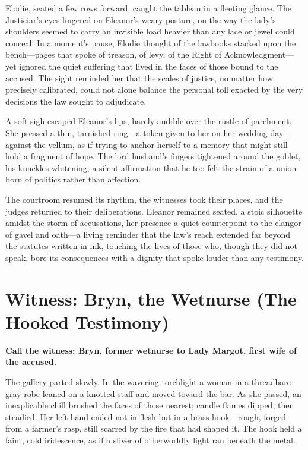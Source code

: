 \documentclass[11pt,twoside]{book}
\begin{document}
Elodie, seated a few rows forward, caught the tableau in a fleeting glance. The Justiciar's eyes lingered on Eleanor's weary posture, on the way the lady's shoulders seemed to carry an invisible load heavier than any lace or jewel could conceal. In a moment's pause, Elodie thought of the lawbooks stacked upon the bench---pages that spoke of treason, of levy, of the Right of Acknowledgment---yet ignored the quiet suffering that lived in the faces of those bound to the accused. The sight reminded her that the scales of justice, no matter how precisely calibrated, could not alone balance the personal toll exacted by the very decisions the law sought to adjudicate.

A soft sigh escaped Eleanor's lips, barely audible over the rustle of parchment. She pressed a thin, tarnished ring---a token given to her on her wedding day---against the vellum, as if trying to anchor herself to a memory that might still hold a fragment of hope. The lord husband's fingers tightened around the goblet, his knuckles whitening, a silent affirmation that he too felt the strain of a union born of politics rather than affection.

The courtroom resumed its rhythm, the witnesses took their places, and the judges returned to their deliberations. Eleanor remained seated, a stoic silhouette amidst the storm of accusations, her presence a quiet counterpoint to the clangor of gavel and oath---a living reminder that the law's reach extended far beyond the statutes written in ink, touching the lives of those who, though they did not speak, bore its consequences with a dignity that spoke louder than any testimony.

\newpage

\newpage
\section*{Witness: Bryn, the Wetnurse (The Hooked Testimony)}
\smallskip
\textbf{Call the witness: Bryn, former wetnurse to Lady Margot, first wife of the accused.}

The gallery parted slowly. In the wavering torchlight a woman in a threadbare gray robe leaned on a knotted staff and moved toward the bar. As she passed, an inexplicable chill brushed the faces of those nearest; candle flames dipped, then steadied. Her left hand ended not in flesh but in a brass hook---rough, forged from a farmer's rasp, still scarred by the fire that had shaped it. The hook held a faint, cold iridescence, as if a sliver of otherworldly light ran beneath the metal.
\end{document}
